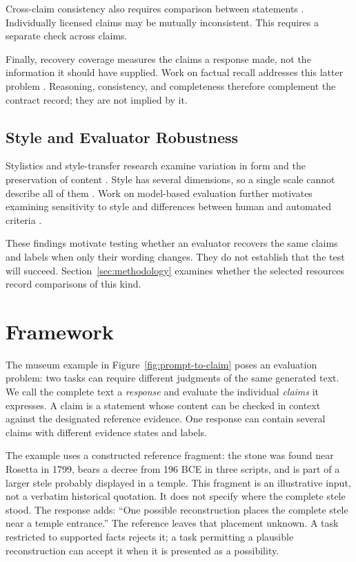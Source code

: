 \documentclass{clv2025}
\begin{document}
Cross-claim consistency also requires comparison between statements
\citep{mundler_selfcontradictory_2024}. Individually licensed claims may be
mutually inconsistent. This requires a separate check across claims.

Finally, recovery coverage measures the claims a response made, not the
information it should have supplied. Work on factual recall addresses this
latter problem \citep{liu_verifact_2025,jafari_recall_2026}.
Reasoning, consistency, and completeness therefore complement the contract
record; they are not implied by it.

\subsection{Style and Evaluator Robustness}

Stylistics and style-transfer research examine variation in form and the
preservation of content
\citep{leech_short_style_1981,vanpeer_stylistics_2020,rao_dear_2018,briakou_evaluating_2021}.
Style has several dimensions, so a single scale cannot describe all of them
\citep{kang_style_2021,jin_deep_2022}.
Work on model-based evaluation further motivates examining sensitivity to
style and differences between human and automated criteria
\citep{feuer_style_2025,lyu_converge_2026}.

These findings motivate testing whether an evaluator recovers the same
claims and labels when only their wording changes. They do not establish
that the test will succeed. Section~\ref{sec:methodology} examines whether the selected
resources record comparisons of this kind.

\section{Framework}\label{sec:framework}

The museum example in Figure~\ref{fig:prompt-to-claim} poses an evaluation
problem: two tasks can require different judgments of the same generated
text. We call the complete text a \emph{response} and evaluate the individual
\emph{claims} it expresses. A claim is a statement whose content can be
checked in context against the designated reference evidence. One response
can contain several claims with different evidence states and labels.

The example uses a constructed reference fragment: the stone was found
near Rosetta in 1799, bears a decree from 196 BCE in three scripts, and is
part of a larger stele probably displayed in a temple. This fragment is an
illustrative input, not a verbatim historical quotation. It does not specify
where the complete stele stood. The response adds: ``One possible
reconstruction places the complete stele near a temple entrance.'' The
reference leaves that placement unknown. A task restricted to supported
facts rejects it; a task permitting a plausible reconstruction can accept
it when it is presented as a possibility.
\end{document}

